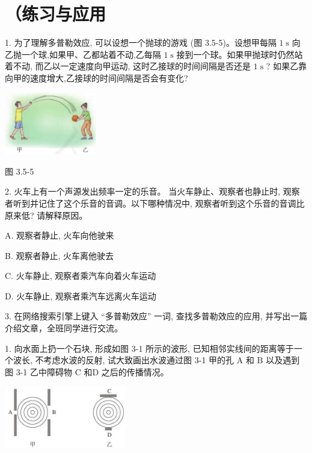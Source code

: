 \documentclass[10pt]{article}
\begin{document}
\section*{（练习与应用}

1. 为了理解多普勒效应, 可以设想一个抛球的游戏 (图 3.5-5)。设想甲每隔 \(1\mathrm{\;s}\) 向乙抛一个球,如果甲、乙都站着不动,乙每隔 \(1\mathrm{\;s}\) 接到一个球。如果甲抛球时仍然站着不动, 而乙以一定速度向甲运动, 这时乙接球的时间间隔是否还是 \(1\mathrm{\;s}\) ? 如果乙靠向甲的速度增大,乙接球的时间间隔是否会有变化?

\begin{center}
\includegraphics[max width=0.3\textwidth]{images/01910e4c-ebb8-7d2c-8f2f-2375bc1d2d12_86_592555.jpg}
\end{center}

图 3.5-5

2. 火车上有一个声源发出频率一定的乐音。 当火车静止、观察者也静止时, 观察者听到并记住了这个乐音的音调。以下哪种情况中, 观察者听到这个乐音的音调比原来低? 请解释原因。

A. 观察者静止, 火车向他驶来

B. 观察者静止, 火车离他驶去

C. 火车静止, 观察者乘汽车向着火车运动

D. 火车静止, 观察者乘汽车远离火车运动

3. 在网络搜索引擎上键入 “多普勒效应” 一词, 查找多普勒效应的应用, 并写出一篇介绍文章，全班同学进行交流。

1. 向水面上扔一个石块, 形成如图 3-1 所示的波形, 已知相邻实线间的距离等于一个波长, 不考虑水波的反射, 试大致画出水波通过图 3-1 甲的孔 \(\mathrm{A}\) 和 \(\mathrm{B}\) 以及遇到图 3-1 乙中障碍物 C 和D 之后的传播情况。

\begin{center}
\includegraphics[max width=0.4\textwidth]{images/01910e4c-ebb8-7d2c-8f2f-2375bc1d2d12_87_990360.jpg}
\end{center}
\end{document}
